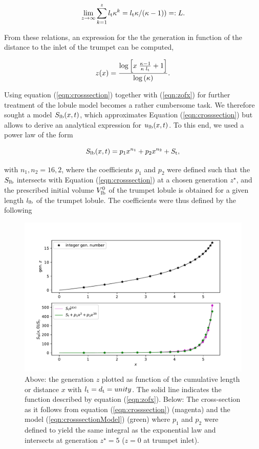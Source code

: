 \begin{equation}
\lim_{z \to \infty}\sum_{k=1}^z l_{\mathrm{t}}\kappa^k = l_{\mathrm{t}}\kappa/(\kappa - 1)) =: L \text{.}
\end{equation}

From these relations, an expression for the the generation in function of the distance to the inlet of the trumpet can be computed,

\begin{equation}\label{eqn:zofx}
z(x) = \frac{\log{\left[x\;\frac{\kappa - 1}{\kappa\;l_{\mathrm{t}}} + 1\right]}}{\log{(\kappa)}}\text{.}
\end{equation}

Using equation (\ref{eqn:crosssection}) together with (\ref{eqn:zofx}) for further treatment of the lobule model becomes a rather cumbersome task.
We therefore sought a model $S_{\mathrm{lb}}(x,t)$, which approximates Equation (\ref{eqn:crosssection}) but allows to derive an analytical expression for $u_{\mathrm{lb}}(x,t)$.
To this end, we used a power law of the form

\begin{equation}\label{eqn:crosssectionModel}
S_{\mathrm{lb}}(x,t) = p_1 x^{n_1} + p_2 x^{n_2} + S_{\mathrm{t}}\text{,}
\end{equation}

with $n_1, n_2 = 16, 2$, where the coefficients $p_1$ and $p_2$ were defined such that the $S_{\mathrm{lb}}$ intersects with Equation (\ref{eqn:crosssection}) at a chosen generation $z^\star$, and the prescribed initial volume $V_{\mathrm{lb}}^0$ of the trumpet lobule is obtained for a given length $l_{\mathrm{lb}}$ of the trumpet lobule.
The coefficients were thus defined by the following

\begin{figure}[tb!]
  \centering
  \includegraphics[width=1.0\textwidth]{figures/trumpet_geometry}
  \caption{Above: the generation $z$ plotted as function of the cumulative length or distance $x$ with $l_{\mathrm{t}} = d_{\mathrm{t}} = unity$. The solid line indicates the function described by equation (\ref{eqn:zofx}). Below: The cross-section as it follows from equation (\ref{eqn:crosssection}) (magenta) and the model (\ref{eqn:crosssectionModel}) (green) where $p_1$ and $p_2$ were defined to yield the same integral as the exponential law and intersects at generation $z^\star = 5$ ($z = 0$ at trumpet inlet).}
  \label{fig:trumpet_geometry}
\end{figure}


